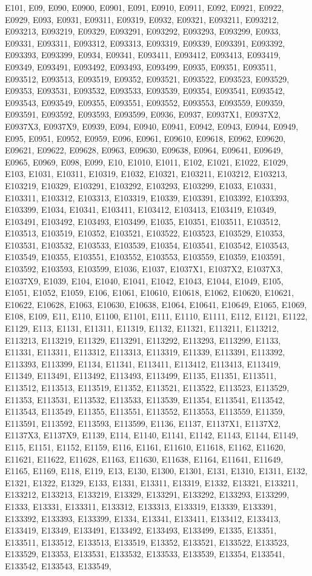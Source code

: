 \documentclass[%
 twocolumn,
 reprint,
 amsmath,amssymb,
 aps,nofootinbib
]{revtex4-2}
\begin{document}
E101, E09, E090, E0900, E0901, E091, E0910, E0911, E092, E0921, E0922, E0929, E093, E0931, E09311, E09319, E0932, E09321, E093211, E093212, E093213, E093219, E09329, E093291, E093292, E093293, E093299, E0933, E09331, E093311, E093312, E093313, E093319, E09339, E093391, E093392, E093393, E093399, E0934, E09341, E093411, E093412, E093413, E093419, E09349, E093491, E093492, E093493, E093499, E0935, E09351, E093511, E093512, E093513, E093519, E09352, E093521, E093522, E093523, E093529, E09353, E093531, E093532, E093533, E093539, E09354, E093541, E093542, E093543, E093549, E09355, E093551, E093552, E093553, E093559, E09359, E093591, E093592, E093593, E093599, E0936, E0937, E0937X1, E0937X2, E0937X3, E0937X9, E0939, E094, E0940, E0941, E0942, E0943, E0944, E0949, E095, E0951, E0952, E0959, E096, E0961, E09610, E09618, E0962, E09620, E09621, E09622, E09628, E0963, E09630, E09638, E0964, E09641, E09649, E0965, E0969, E098, E099, E10, E1010, E1011, E102, E1021, E1022, E1029, E103, E1031, E10311, E10319, E1032, E10321, E103211, E103212, E103213, E103219, E10329, E103291, E103292, E103293, E103299, E1033, E10331, E103311, E103312, E103313, E103319, E10339, E103391, E103392, E103393, E103399, E1034, E10341, E103411, E103412, E103413, E103419, E10349, E103491, E103492, E103493, E103499, E1035, E10351, E103511, E103512, E103513, E103519, E10352, E103521, E103522, E103523, E103529, E10353, E103531, E103532, E103533, E103539, E10354, E103541, E103542, E103543, E103549, E10355, E103551, E103552, E103553, E103559, E10359, E103591, E103592, E103593, E103599, E1036, E1037, E1037X1, E1037X2, E1037X3, E1037X9, E1039, E104, E1040, E1041, E1042, E1043, E1044, E1049, E105, E1051, E1052, E1059, E106, E1061, E10610, E10618, E1062, E10620, E10621, E10622, E10628, E1063, E10630, E10638, E1064, E10641, E10649, E1065, E1069, E108, E109, E11, E110, E1100, E1101, E111, E1110, E1111, E112, E1121, E1122, E1129, E113, E1131, E11311, E11319, E1132, E11321, E113211, E113212, E113213, E113219, E11329, E113291, E113292, E113293, E113299, E1133, E11331, E113311, E113312, E113313, E113319, E11339, E113391, E113392, E113393, E113399, E1134, E11341, E113411, E113412, E113413, E113419, E11349, E113491, E113492, E113493, E113499, E1135, E11351, E113511, E113512, E113513, E113519, E11352, E113521, E113522, E113523, E113529, E11353, E113531, E113532, E113533, E113539, E11354, E113541, E113542, E113543, E113549, E11355, E113551, E113552, E113553, E113559, E11359, E113591, E113592, E113593, E113599, E1136, E1137, E1137X1, E1137X2, E1137X3, E1137X9, E1139, E114, E1140, E1141, E1142, E1143, E1144, E1149, E115, E1151, E1152, E1159, E116, E1161, E11610, E11618, E1162, E11620, E11621, E11622, E11628, E1163, E11630, E11638, E1164, E11641, E11649, E1165, E1169, E118, E119, E13, E130, E1300, E1301, E131, E1310, E1311, E132, E1321, E1322, E1329, E133, E1331, E13311, E13319, E1332, E13321, E133211, E133212, E133213, E133219, E13329, E133291, E133292, E133293, E133299, E1333, E13331, E133311, E133312, E133313, E133319, E13339, E133391, E133392, E133393, E133399, E1334, E13341, E133411, E133412, E133413, E133419, E13349, E133491, E133492, E133493, E133499, E1335, E13351, E133511, E133512, E133513, E133519, E13352, E133521, E133522, E133523, E133529, E13353, E133531, E133532, E133533, E133539, E13354, E133541, E133542, E133543, E133549, 
\end{document}
